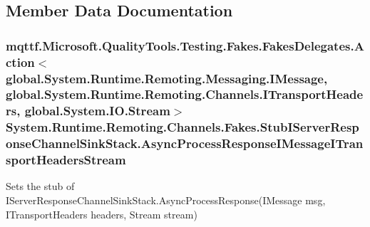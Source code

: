 \subsection{Member Data Documentation}
\hypertarget{class_system_1_1_runtime_1_1_remoting_1_1_channels_1_1_fakes_1_1_stub_i_server_response_channel_sink_stack_a6b2e61d70fb9159221032e01b8dc911c}{
\subsubsection[{Async\-Process\-Response\-I\-Message\-I\-Transport\-Headers\-Stream}]{\setlength{\rightskip}{0pt plus 5cm}mqttf.\-Microsoft.\-Quality\-Tools.\-Testing.\-Fakes.\-Fakes\-Delegates.\-Action$<$global.\-System.\-Runtime.\-Remoting.\-Messaging.\-I\-Message, global.\-System.\-Runtime.\-Remoting.\-Channels.\-I\-Transport\-Headers, global.\-System.\-I\-O.\-Stream$>$ System.\-Runtime.\-Remoting.\-Channels.\-Fakes.\-Stub\-I\-Server\-Response\-Channel\-Sink\-Stack.\-Async\-Process\-Response\-I\-Message\-I\-Transport\-Headers\-Stream}}\label{class_system_1_1_runtime_1_1_remoting_1_1_channels_1_1_fakes_1_1_stub_i_server_response_channel_sink_stack_a6b2e61d70fb9159221032e01b8dc911c}


Sets the stub of I\-Server\-Response\-Channel\-Sink\-Stack.\-Async\-Process\-Response(\-I\-Message msg, I\-Transport\-Headers headers, Stream stream)

